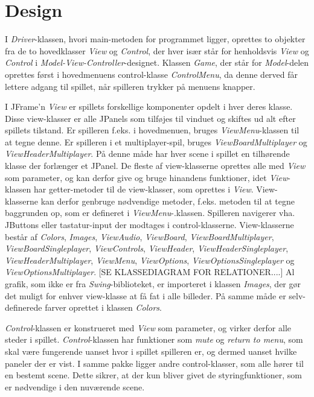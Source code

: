 \documentclass{report}
\begin{document}
\section{Design}
I \textit{Driver}-klassen, hvori main-metoden for programmet ligger, oprettes to objekter fra de to hovedklasser \textit{View} og \textit{Control}, der hver især står for henholdsvis \textit{View} og \textit{Control} i \textit{Model-View-Controller}-designet. Klassen \textit{Game}, der står for \textit{Model}-delen oprettes først i hovedmenuens control-klasse \textit{ControlMenu}, da denne derved får lettere adgang til spillet, når spilleren trykker på menuens knapper. 

I JFrame'n \textit{View} er spillets forskellige komponenter opdelt i hver deres klasse. Disse view-klasser er alle JPanels som tilføjes til vinduet og skiftes ud alt efter spillets tilstand. Er spilleren f.eks. i hovedmenuen, bruges \textit{ViewMenu}-klassen til at tegne denne. Er spilleren i et multiplayer-spil, bruges \textit{ViewBoardMultiplayer} og \textit{ViewHeaderMultiplayer}. På denne måde har hver scene i spillet en tilhørende klasse der forlænger et JPanel. De fleste af view-klasserne oprettes alle med \textit{View} som parameter, og kan derfor give og bruge hinandens funktioner, idet \textit{View}-klassen har getter-metoder til de view-klasser, som oprettes i \textit{View}. View-klasserne kan derfor genbruge nødvendige metoder, f.eks. metoden til at tegne baggrunden op, som er defineret i \textit{ViewMenu}-.klassen. Spilleren navigerer vha. JButtons eller tastatur-input der modtages i control-klasserne.
View-klasserne består af \textit{Colors}, \textit{Images}, \textit{ViewAudio}, \textit{ViewBoard}, \textit{ViewBoardMultiplayer}, \textit{ViewBoardSingleplayer}, \textit{ViewControls}, \textit{ViewHeader}, \textit{ViewHeaderSingleplayer}, \textit{ViewHeaderMultiplayer}, \textit{ViewMenu}, \textit{ViewOptions}, \textit{ViewOptionsSingleplayer} og \textit{ViewOptionsMultiplayer}. [SE KLASSEDIAGRAM FOR RELATIONER....]
Al grafik, som ikke er fra \textit{Swing}-biblioteket, er importeret i klassen \textit{Images}, der gør det muligt for enhver view-klasse at få fat i alle billeder. På samme måde er selv-definerede farver oprettet i klassen \textit{Colors}.

\textit{Control}-klassen er konstrueret med \textit{View} som parameter, og virker derfor alle steder i spillet. \textit{Control}-klassen har funktioner som \textit{mute} og \textit{return to menu}, som skal være fungerende uanset hvor i spillet spilleren er, og dermed uanset hvilke paneler der er vist. I samme pakke ligger andre control-klasser, som alle hører til en bestemt scene. Dette sikrer, at der kun bliver givet de styringfunktioner, som er nødvendige i den nuværende scene.
\end{document}
